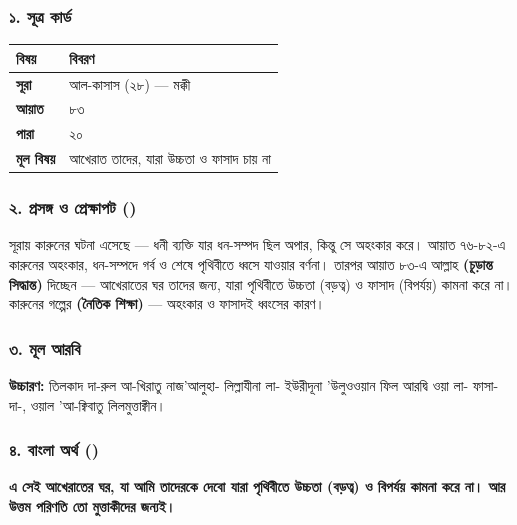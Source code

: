 \subsubsection*{১. সূত্র কার্ড}

\begin{table}[h]\centering\small
\begin{tabular}{ll}
বিষয় & বিবরণ \\
\hline
\textbf{সূরা} & আল-কাসাস (২৮) — মক্কী \\
\textbf{আয়াত} & ৮৩ \\
\textbf{পারা} & ২০ \\
\textbf{মূল বিষয়} & আখেরাত তাদের, যারা উচ্চতা ও ফাসাদ চায় না \\
\hline
\end{tabular}
\end{table}

\subsubsection*{২. প্রসঙ্গ ও প্রেক্ষাপট ()}

সূরায় কারুনের ঘটনা এসেছে — ধনী ব্যক্তি যার ধন-সম্পদ ছিল অপার, কিন্তু সে অহংকার করে। আয়াত ৭৬-৮২-এ কারুনের অহংকার, ধন-সম্পদে গর্ব ও শেষে পৃথিবীতে ধ্বসে যাওয়ার বর্ণনা। তারপর আয়াত ৮৩-এ আল্লাহ \textbf{  (চূড়ান্ত সিদ্ধান্ত)} দিচ্ছেন — আখেরাতের ঘর তাদের জন্য, যারা পৃথিবীতে উচ্চতা (বড়ত্ব) ও ফাসাদ (বিপর্যয়) কামনা করে না। কারুনের গল্পের \textbf{ (নৈতিক শিক্ষা)} — অহংকার ও ফাসাদই ধ্বংসের কারণ।

\subsubsection*{৩. মূল আরবি}
\begin{center}\end{center}
\textbf{উচ্চারণ:} তিলকাদ দা-রুল আ-খিরাতু নাজ'আলুহা- লিল্লাযীনা লা- ইউরীদূনা 'উলুওওয়ান ফিল আরদ্বি ওয়া লা- ফাসা-দা-, ওয়াল 'আ-ক্বিবাতু লিলমুত্তাক্বীন।

\subsubsection*{৪. বাংলা অর্থ ()}
\textbf{এ সেই আখেরাতের ঘর, যা আমি তাদেরকে দেবো যারা পৃথিবীতে উচ্চতা (বড়ত্ব) ও বিপর্যয় কামনা করে না। আর উত্তম পরিণতি তো মুত্তাকীদের জন্যই।}

